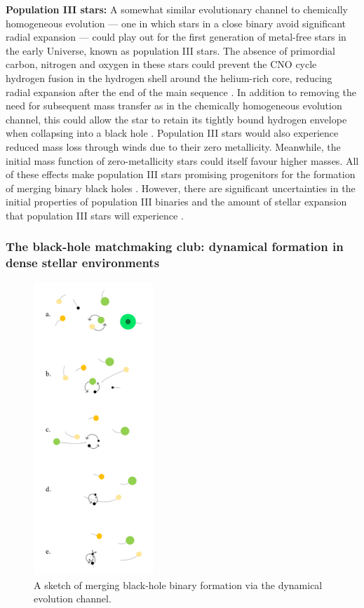 \documentclass[review]{elsarticle}
\begin{document}
\textbf{Population III stars:} A somewhat similar evolutionary channel to chemically homogeneous evolution --- one in which stars in a close binary avoid significant radial expansion --- could play out for the first generation of metal-free stars in the early Universe, known as population III stars.  The absence of primordial carbon, nitrogen and oxygen in these stars could prevent the CNO cycle hydrogen fusion in the hydrogen shell around the helium-rich core, reducing radial expansion after the end of the main sequence \citep{Marigo:2001}.  In addition to removing the need for subsequent mass transfer as in the chemically homogeneous evolution channel, this could allow the star to retain its tightly bound hydrogen envelope when collapsing into a black hole \citep{Kinugawa:2021}.  Population III stars would also experience reduced mass loss through winds due to their zero metallicity.   Meanwhile, the initial mass function of zero-metallicity stars could itself favour higher masses.  All of these effects make population III stars promising progenitors for the formation of merging binary black holes \citep{Belczynski:2004popIII,Kinugawa:2014,Inayoshi:2017}.  However, there are significant uncertainties in the initial properties of population III binaries and the amount of stellar expansion that population III stars will experience \citep{Hirano:2014,Stacy:2016,Hartwig:2016,Belczynski:2017popIII}.



\subsubsection{The black-hole matchmaking club: dynamical formation in dense stellar environments}

\begin{figure}
	\centering
	\includegraphics[width=0.4\textwidth]{channel3.png}
	\caption{\label{fig:dynamical} A sketch of merging black-hole binary formation via the dynamical evolution channel.}
\end{figure}
\end{document}
